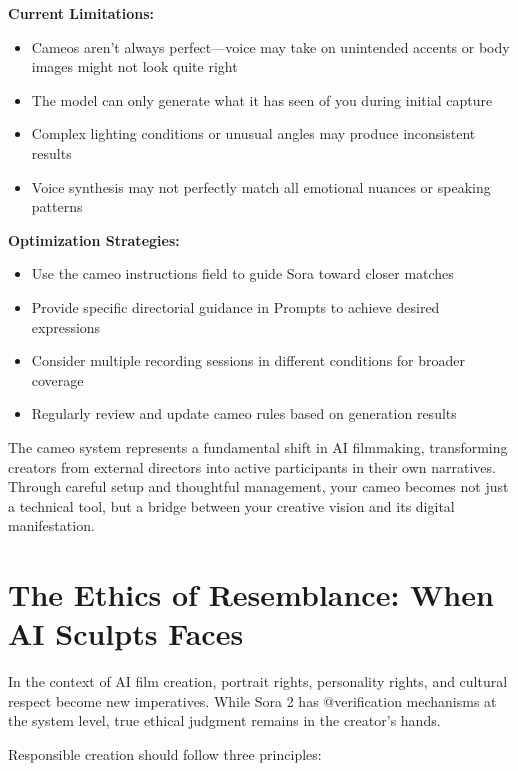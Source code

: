 \textbf{Current Limitations:}
\begin{itemize}
\item Cameos aren't always perfect—voice may take on unintended accents or body images might not look quite right
\item The model can only generate what it has seen of you during initial capture
\item Complex lighting conditions or unusual angles may produce inconsistent results
\item Voice synthesis may not perfectly match all emotional nuances or speaking patterns \citep{openai2024cameos}
\end{itemize}

\textbf{Optimization Strategies:}
\begin{itemize}
\item Use the cameo instructions field to guide Sora toward closer matches
\item Provide specific directorial guidance in Prompts to achieve desired expressions
\item Consider multiple recording sessions in different conditions for broader coverage
\item Regularly review and update cameo rules based on generation results
\end{itemize}

The cameo system represents a fundamental shift in AI filmmaking, transforming creators from external directors into active participants in their own narratives. Through careful setup and thoughtful management, your cameo becomes not just a technical tool, but a bridge between your creative vision and its digital manifestation.

\section{The Ethics of Resemblance: When AI Sculpts Faces}
\label{sec:resemblance-ethics}

In the context of AI film creation, portrait rights, personality rights, and cultural respect become new imperatives. While Sora 2 has @verification mechanisms at the system level, true ethical judgment remains in the creator's hands.

Responsible creation should follow three principles:

